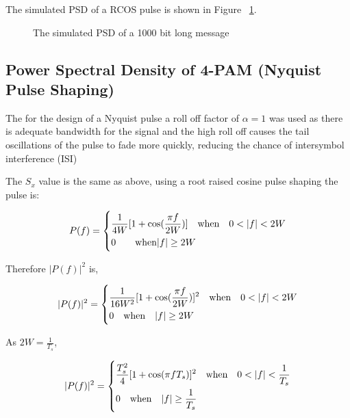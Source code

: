 The simulated PSD of a RCOS pulse is shown in Figure ~\ref{fig:sim-psd}.

\begin{figure}[H]
    \begin{center}
        
        \label{fig:sim-psd}
        \caption{The simulated PSD of a 1000 bit long message}
    \end{center}
\end{figure}

\subsection{Power Spectral Density of 4-PAM (Nyquist Pulse Shaping)}
The for the design of a Nyquist pulse a roll off factor of $\alpha = 1$ was used as there is adequate bandwidth
for the signal and the high roll off causes the tail oscillations of the pulse to fade more quickly, reducing the
chance of intersymbol interference (ISI)

The $S_x$ value is the same as above, using a root raised cosine pulse shaping the pulse is:

\begin{equation}
    \label{eqn:pf-w-niquist}
    P(f) =
    \begin{dcases}
        \frac{1}{4W} [1+\textrm{cos}(\frac{\pi f}{2W})] \quad \textrm{when} \quad 0<|f|<2W \\
        0 \quad \quad \textrm{when} |f| \geq 2W
    \end{dcases}
\end{equation}

Therefore $|P(f)|^2$ is,

\begin{equation}
    \label{eqn-pf2-nyquist}
    |P(f)|^2 =
    \begin{dcases}
        \frac{1}{16W^2}[1+\textrm{cos}(\frac{\pi f}{2W})]^2 \quad \textrm{when} \quad 0<|f|<2W \\
        0 \quad \textrm{when} \quad |f| \geq 2W
    \end{dcases}
\end{equation}

As $2W = \frac{1}{T_s}$,

\begin{equation}
    \label{eqn-pf2-nyquist-ts}
    |P(f)|^2 =
    \begin{dcases}
        \frac{T_s^2}{4}[1+\textrm{cos}(\pi f T_s)]^2 \quad \textrm{when} \quad 0<|f|<\frac{1}{T_s} \\
        0 \quad \textrm{when} \quad |f| \geq \frac{1}{T_s}
    \end{dcases}
\end{equation}

